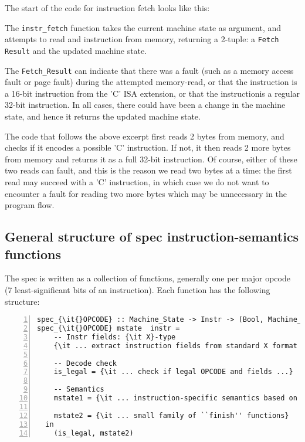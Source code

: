 \documentclass[11pt]{article}
\begin{document}
The start of the code for instruction fetch looks like this:



The \verb|instr_fetch| function takes the current machine state as
argument, and attempts to read and instruction from memory, returning
a 2-tuple: a \verb|Fetch Result| and the updated machine state.

The \verb|Fetch_Result| can indicate that there was a fault (such as a
memory access fault or page fault) during the attempted memory-read,
or that the instruction is a 16-bit instruction from the 'C' ISA
extension, or that the instructionis a regular 32-bit instruction.  In
all cases, there could have been a change in the machine state, and
hence it returns the updated machine state.

The code that follows the above excerpt first reads 2 bytes from
memory, and checks if it encodes a possible 'C' instruction. If not,
it then reads 2 more bytes from memory and returns it as a full 32-bit
instruction.  Of course, either of these two reads can fault, and this
is the reason we read two bytes at a time: the first read may succeed
with a 'C' instruction, in which case we do not want to encounter a
fault for reading two more bytes which may be unnecessary in the
program flow.


\subsection{General structure of spec instruction-semantics functions}

The spec is written as a collection of functions, generally one per
major opcode (7 least-significant bits of an instruction).  Each
function has the following structure:

{\small
\begin{Verbatim}[frame=single, numbers=left, commandchars=\\\{\}]
spec_{\it{}OPCODE} :: Machine_State -> Instr -> (Bool, Machine_State) \\
spec_{\it{}OPCODE} mstate  instr =
    -- Instr fields: {\it X}-type
    {\it ... extract instruction fields from standard X format ...}

    -- Decode check
    is_legal = {\it ... check if legal OPCODE and fields ...}

    -- Semantics
    mstate1 = {\it ... instruction-specific semantics based on {\tt mstate} ...}

    mstate2 = {\it ... small family of ``finish'' functions}
  in
    (is_legal, mstate2)
\end{Verbatim}
}
\end{document}
